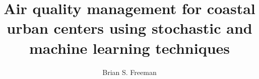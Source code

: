 
\title{Air quality management for coastal urban centers using stochastic and machine learning techniques}
%
\author{Brian S. Freeman}
%
%
%
%

\chair{  }
%
\othermembers{ }
%
%


\maketitle



